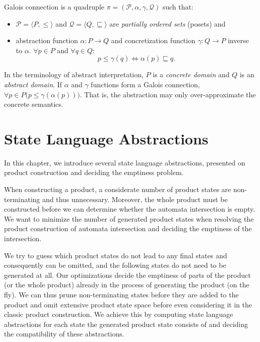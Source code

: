 \begin{definition} \hfill \newline
Galois connection is a quadruple $\pi = (\mathcal{P}, \alpha, \gamma, \mathcal{Q})$ such that:

\begin{itemize}
    \item $\mathcal{P} = \langle P, \leq \rangle$ and $\mathcal{Q} = \langle Q, \sqsubseteq \rangle$ are \emph{partially ordered sets} (posets) and
    \item abstraction function $\alpha : P \rightarrow Q$ and concretization function $\gamma : Q \rightarrow P$ inverse to $\alpha$. $\forall p \in P$ and $\forall q \in Q$:
    \[
        p \leq \gamma(q) \Leftrightarrow \alpha(p) \sqsubseteq q \text{.}
    \]
\end{itemize}

\end{definition}

In the terminology of abstract interpretation, $P$ is a \emph{concrete domain} and $Q$ is an \emph{abstract domain}. If $\alpha$ and $\gamma$ functions form a Galois connection, $\forall p \in P \bigr( p \leq \gamma(\alpha(p)) \bigr)$. That is, the abstraction may only over-approximate the concrete semantics.


\chapter{State Language Abstractions}

In this chapter, we introduce several state language abstractions, presented on product construction and deciding the emptiness problem.

When constructing a product, a considerate number of product states are non-terminating and thus unnecessary. Moreover, the whole product must be constructed before we can determine whether the automata intersection is empty. We want to minimize the number of generated product states when resolving the product construction of automata intersection and deciding the emptiness of the intersection.

We try to guess which product states do not lead to any final states and consequently can be omitted, and the following states do not need to be generated at all. Our optimizations decide the emptiness of parts of the product (or the whole product) already in the process of generating the product (on the fly). We can thus prune non-terminating states before they are added to the product and omit extensive product state space before even considering it in the classic product construction. We achieve this by computing state language abstractions for each state the generated product state consists of and deciding the compatibility of these abstractions.

